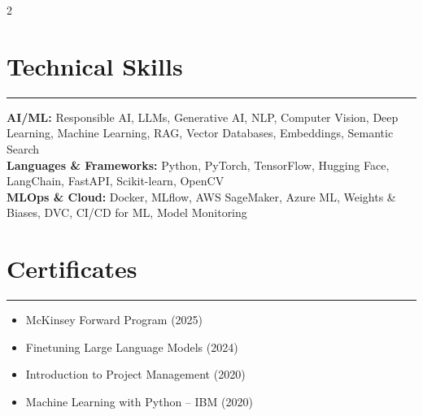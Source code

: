 \documentclass[9pt]{extarticle}
\begin{document}
\begin{multicols}{2}
\section{Technical Skills}
\vspace{-6pt}\hrule\vspace{4pt}
\textbf{AI/ML:} Responsible AI, LLMs, Generative AI, NLP, Computer Vision, Deep Learning, Machine Learning, RAG, Vector Databases, Embeddings, Semantic Search \\
\textbf{Languages \& Frameworks:} Python, PyTorch, TensorFlow, Hugging Face, LangChain, FastAPI, Scikit-learn, OpenCV \\
\textbf{MLOps \& Cloud:} Docker, MLflow, AWS SageMaker, Azure ML, Weights \& Biases, DVC, CI/CD for ML, Model Monitoring

\columnbreak

\section{Certificates}
\vspace{-6pt}\hrule\vspace{4pt}
\begin{itemize}
    \item McKinsey Forward Program (2025)
    \item Finetuning Large Language Models (2024)
    \item Introduction to Project Management (2020)
    \item Machine Learning with Python -- IBM (2020)
\end{itemize}
\end{multicols}

\vspace{-5pt}
\end{document}
